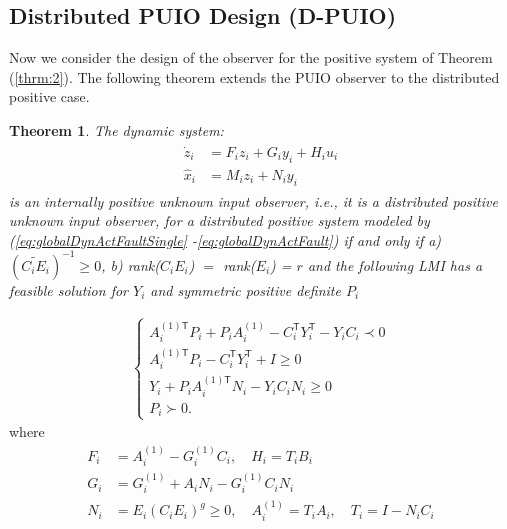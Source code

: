 \documentclass[letterpaper, 10 pt, conference]{ieeeconf}  %
\newtheorem{theorem}{Theorem}
\def\tT{\mathsf{T}} %
\def\cG{\mathcal{G}}
\newcommand{\ie}{\textit{i}.\textit{e}., }
\begin{document}
\subsection{Distributed PUIO Design (D-PUIO)}
Now we consider the design of the observer for the positive system of Theorem (\ref{thrm:2}). The following theorem extends the PUIO observer to the distributed positive case.
\begin{theorem} \label{thrm:DPUIO}
The dynamic system:
\begin{gather} \label{eq:DPUIO}
\begin{aligned} 
\dot{z}_i &= F_iz_i +G_iy_i +H_iu_i \\ 
\hat{x}_i &= M_iz_i + N_iy_i 
\end{aligned}
\end{gather}
is an internally positive unknown input observer, \ie it is a distributed positive unknown input observer, for a distributed positive system modeled by (\ref{eq:globalDynActFaultSingle} -\ref{eq:globalDynActFault})
if and only if a) $(\widetilde{C_iE_i})^{-1} \geq 0$, b) rank($C_iE_i$) $=$ rank($E_i$) = $r$ and the following LMI has a feasible solution for $Y_i$ and symmetric positive definite $P_i$
\end{theorem}
\begin{align} \label{eq:dLMI}
   \begin{cases}
   \displaystyle A_i^{(1)\tT} P_i + P_iA_i^{(1)} -C^{\tT}_i Y_i^{\tT} - Y_iC_i \prec 0 \\
   \displaystyle A_i^{(1)\tT} P_i -C_i^{\tT} Y_i^{\tT} + I \geq 0 \\
   \displaystyle Y_i + P_i A_i^{(1)\tT} N_i - Y_iC_iN_i \geq 0 \\
   \displaystyle P_i \succ 0.
   \end{cases}
\end{align}
where 
\begin{align*}
    F_i &= A_i^{(1)} - G_i^{(1)} C_i, \quad H_i = T_iB_i \\
    G_i &= G_i^{(1)} +A_i N_i - G_i^{(1)} C_i N_i \\
    N_i &= E_i(C_iE_i)^g \geq 0, \quad A_i^{(1)} = T_iA_i, \quad T_i=I-N_iC_i
\end{align*}
\end{document}
